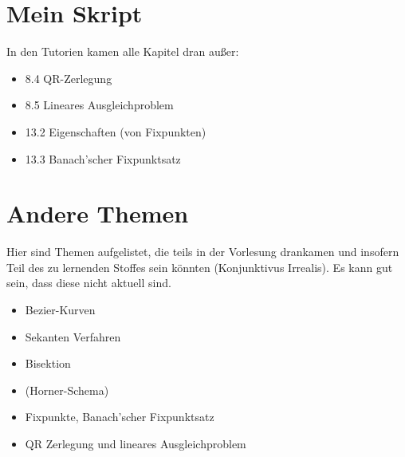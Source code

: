 \documentclass{scrartcl}
\begin{document}
	\newpage
	\section{Mein Skript}
	
	In den Tutorien kamen alle Kapitel dran außer:
	\begin{itemize}
		\item 8.4 QR-Zerlegung
		\item 8.5 Lineares Ausgleichproblem
		\item 13.2 Eigenschaften (von Fixpunkten)
		\item 13.3 Banach'scher Fixpunktsatz
	\end{itemize}
	
	\newpage
	\section{Andere Themen}
	
	Hier sind Themen aufgelistet, die teils in der Vorlesung drankamen und insofern Teil des zu lernenden Stoffes sein könnten (Konjunktivus Irrealis). Es kann gut sein, dass diese nicht aktuell sind.
	
	\begin{itemize}
		\item Bezier-Kurven
		\item Sekanten Verfahren %
		\item Bisektion
		\item (Horner-Schema)
		\item Fixpunkte, Banach'scher Fixpunktsatz
		\item QR Zerlegung und lineares Ausgleichproblem
	\end{itemize}
	
\end{document}
